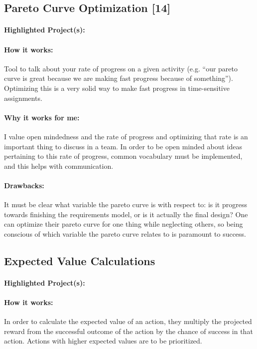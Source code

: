 \documentclass[a4paper,12pt]{article}
\begin{document}
\subsection{Pareto Curve Optimization [14]}
\paragraph{Highlighted Project(s): }

\paragraph{How it works: }
Tool to talk about your rate of progress on a given activity (e.g. “our pareto curve is great because we are making fast progress because of {something}”). Optimizing this is a very solid way to make fast progress in time-sensitive assignments.


\paragraph{Why it works for me: }
I value open mindedness and the rate of progress and optimizing that rate is an important thing to discuss in a team. In order to be open minded about ideas pertaining to this rate of progress, common vocabulary must be implemented, and this helps with communication.


\paragraph{Drawbacks: }
It must be clear what variable the pareto curve is with respect to: is it progress towards finishing the requirements model, or is it actually the final design? One can optimize their pareto curve for one thing while neglecting others, so being conscious of which variable the pareto curve relates to is paramount to success.



\subsection{Expected Value Calculations}
\paragraph{Highlighted Project(s): }

\paragraph{How it works: }
In order to calculate the expected value of an action, they multiply the projected reward from the successful outcome of the action by the chance of success in that action. Actions with higher expected values are to be prioritized.
\end{document}
